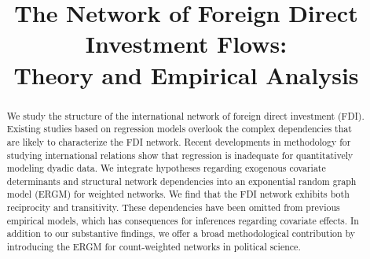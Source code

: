\documentclass[reqno,onecolumn,letterpaper,12pt]{article}
\begin{document}
\title{The Network of Foreign Direct Investment Flows: \\Theory and Empirical Analysis} %
\date{}
\maketitle

\thispagestyle{empty}
\singlespacing
\begin{abstract}
    \noindent We study the structure of the international network of foreign direct investment (FDI). Existing studies based on regression models overlook the complex dependencies that are likely to characterize the FDI network. Recent developments in methodology for studying international relations show that regression is inadequate for quantitatively modeling dyadic data. We integrate hypotheses regarding exogenous covariate determinants and structural network dependencies into an exponential random graph model (ERGM) for weighted networks. We find that the FDI network exhibits both reciprocity and transitivity. These dependencies have been omitted from previous empirical models, which has consequences for inferences regarding covariate effects. In addition to our substantive findings, we offer a broad methodological contribution by introducing the ERGM for count-weighted networks in political science.

\end{abstract}
~\\

\end{document}
